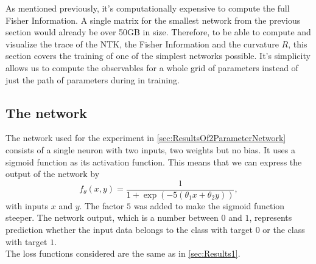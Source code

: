As mentioned previously, it's computationally expensive to compute the full Fisher Information. A single matrix for the smallest network from the previous section would already be over 50GB in size. Therefore, to be able to compute and visualize the trace of the NTK, the Fisher Information and the curvature $R$, this section covers the training of one of the simplest networks possible. It's simplicity allows us to compute the observables for a whole grid of parameters instead of just the path of parameters during in training.

\subsection{The network}
The network used for the experiment in \cref{sec:ResultsOf2ParameterNetwork} consists of a single neuron with two inputs, two weights but no bias. It uses a sigmoid function \cite{ActivationFunctionOverview} as its activation function. This means that we can express the output of the network by 
\begin{equation}\label{eq:Results2Sigmoid}
	f_\theta(x,y) = \frac{1}{1+ \exp (-5(\theta_1 x + \theta_2 y))},
\end{equation}
with inputs $x$ and $y$. The factor $5$ was added to make the sigmoid function steeper. The network output, which is a number between $0$ and $1$, represents prediction whether the input data belongs to the class with target $0$ or the class with target $1$.\\
The loss functions considered are the same as in \cref{sec:Results1}.

